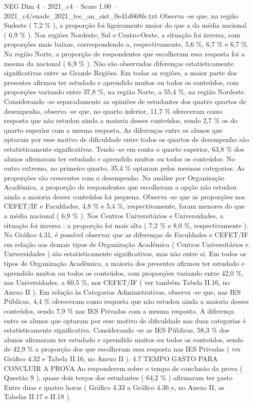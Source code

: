 \begin{textsample}{NEG Dim 4 – 2021\_c4 – Score 1.00 – 2021\_c4/enade\_2021\_tec\_an\_sist\_0e41d668fe.txt}
Observa -se que, na região Sudeste ( 7,2 \% ), a proporção foi ligeiramente maior do que a da média nacional ( 6,9 \% ).
Nas regiões Nordeste, Sul e Centro-Oeste, a situação foi inversa, com proporções mais baixas, correspondendo a, respectivamente, 5,6 \%, 6,7 \% e 6,7 \%.
Na região Norte, a proporção de respondentes que escolheram essa resposta foi a mesma da nacional ( 6,9 \% ).
Não são observadas diferenças estatisticamente significativas entre as Grande Regiões.
Em todas as regiões, a maior parte dos presentes afirmou ter estudado e aprendido muitos ou todos os conteúdos, com proporções variando entre 37,8 \%, na região Norte, a 55,4 \%, na região Nordeste.
Considerando -se separadamente as opiniões de estudantes dos quatro quartos de desempenho, observa -se que, no quarto inferior, 11,7 \% ofereceram como resposta que não estudou ainda a maioria desses conteúdos, sendo 2,7 \% os do quarto superior com a mesma resposta.
As diferenças entre os alunos que optaram por esse motivo de dificuldade entre todos os quartos de desempenho são estatisticamente significativas.
Tendo -se em conta o quarto superior, 63,8 \% dos alunos afirmaram ter estudado e aprendido muitos ou todos os conteúdos.
No outro extremo, no primeiro quarto, 35,4 \% optaram pelas mesmas categorias.
As proporções são crescentes com o desempenho.
Na análise por Organização Acadêmica, a proporção de respondentes que escolheram a opção não estudou ainda a maioria desses conteúdos foi pequena.
Observa -se que as proporções nos CEFET/IF e Faculdades, 4,8 \% e 5,4 \%, respectivamente, foram menores do que a média nacional ( 6,9 \% ).
Nos Centros Universitários e Universidades, a situação foi inversa : a proporção foi mais alta ( 7,2 \% e 8,0 \%, respectivamente ).
No Gráfico 4.31, é possível observar que as diferenças de Faculdades e CEFET/IF em relação aos demais tipos de Organização Acadêmica ( Centros Universitários e Universidades ) são estatisticamente significativas, mas não entre si.
Em todos os tipos de Organização Acadêmica, a maioria dos presentes afirmou ter estudado e aprendido muitos ou todos os conteúdos, com proporções variando entre 42,0 \%, nas Universidades, a 60,5 \%, nos CEFET/IF ( ver também Tabela II.16, no Anexo II ).
Em relação às Categorias Administrativas, observa -se que, nas IES Públicas, 4,4 \% ofereceram como resposta que não estudou ainda a maioria desses conteúdos, sendo 7,9 \% nas IES Privadas com a mesma resposta.
A diferença entre os alunos que optaram por esse motivo de dificuldade nas duas categorias é estatisticamente significativa.
Considerando -se as IES Públicas, 58,3 \% dos alunos afirmaram ter estudado e aprendido muitos ou todos os conteúdos, sendo de 42,9 \% a proporção dos que escolheram essa resposta nas IES Privadas ( ver Gráfico 4.32 e Tabela II.16, no Anexo II ). 4.7 TEMPO GASTO PARA CONCLUIR A PROVA Ao responderem sobre o tempo de conclusão da prova ( Questão 9 ), quase dois terços dos estudantes ( 64,2 \% ) afirmaram ter gasto Entre duas e quatro horas ( Gráfico 4.33 a Gráfico 4.36 e, no Anexo II, as Tabelas II.17 e II.18 ).

\end{textsample}
